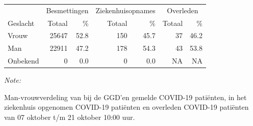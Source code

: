 \documentclass[
  english,
  man,floatsintext]{apa6}
\begin{document}
\begin{table}
\centering\begingroup\fontsize{11}{13}\selectfont

\begin{threeparttable}
\begin{tabular}{lrrrrrr}
\toprule
\multicolumn{1}{c}{ } & \multicolumn{2}{c}{Besmettingen} & \multicolumn{2}{c}{Ziekenhuisopnames} & \multicolumn{2}{c}{Overleden} \\
\cmidrule(l{3pt}r{3pt}){2-3} \cmidrule(l{3pt}r{3pt}){4-5} \cmidrule(l{3pt}r{3pt}){6-7}
Geslacht & Totaal & \% & Totaal & \% & Totaal & \%\\
\midrule
Vrouw & 25647 & 52.8 & 150 & 45.7 & 37 & 46.2\\
Man & 22911 & 47.2 & 178 & 54.3 & 43 & 53.8\\
Onbekend & 0 & 0.0 & 0 & 0.0 & NA & NA\\
\bottomrule
\end{tabular}
\begin{tablenotes}
\item \textit{Note: } 
\item Man-vrouwverdeling van bij de GGD’en gemelde COVID-19 patiënten, in het ziekenhuis opgenomen COVID-19 patiënten en overleden COVID-19 patiënten van 07 oktober t/m 21 oktober 10:00 uur.
\end{tablenotes}
\end{threeparttable}
\endgroup{}
\end{table}
\newpage
\end{document}
